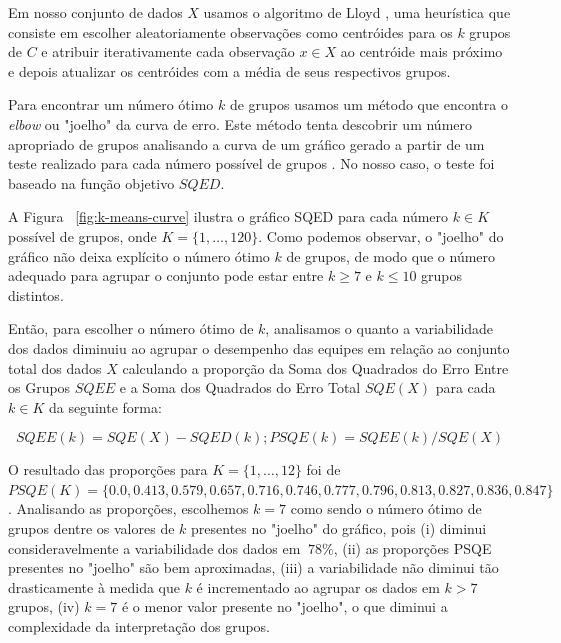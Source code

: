 Em nosso conjunto de dados $X$ usamos o algoritmo de Lloyd \cite{ong2015player}, uma heurística que consiste em escolher aleatoriamente observações como centróides para os $k$ grupos de $C$ e atribuir iterativamente cada observação $x \in X$ ao centróide mais próximo e depois atualizar os centróides com a média de seus respectivos grupos.

Para encontrar um número ótimo $k$ de grupos usamos um método que encontra o \textit{elbow} ou "joelho" da curva de erro. Este método tenta descobrir um número apropriado de grupos analisando a curva de um gráfico gerado a partir de um teste realizado para cada número possível de grupos \cite{kodinariya2013review}. No nosso caso, o teste foi baseado na função objetivo $SQED$.


A Figura ~\ref{fig:k-means-curve} ilustra o gráfico SQED para cada número $k \in K$ possível de grupos, onde $K = \{1, \ldots, 120\}$. Como podemos observar, o "joelho" do gráfico não deixa explícito o número ótimo $k$ de grupos, de modo que o número adequado para agrupar o conjunto pode estar entre $k \geq 7$ e $k \leq 10$ grupos distintos.

Então, para escolher o número ótimo de $k$, analisamos o quanto a variabilidade dos dados diminuiu ao agrupar o desempenho das equipes em relação ao conjunto total dos dados $X$ calculando a proporção da Soma dos Quadrados do Erro Entre os Grupos $SQEE$ e a Soma dos Quadrados do Erro Total $SQE(X)$ para cada $k \in K$ da seguinte forma:

\begin{displaymath}
  SQEE(k) = SQE(X) - SQED(k); PSQE(k) = SQEE(k)/SQE(X)
\end{displaymath}

O resultado das proporções para $K=\{1, \ldots, 12\}$ foi de $PSQE(K) = \{0.0, 0.413, 0.579, 0.657, 0.716, 0.746, 0.777, 0.796, 0.813, 0.827, 0.836, 0.847\}$. Analisando as proporções, escolhemos $k=7$ como sendo o número ótimo de grupos dentre os valores de $k$ presentes no "joelho" do gráfico, pois (i) diminui consideravelmente a variabilidade dos dados em $~78\%$, (ii) as proporções PSQE presentes no "joelho" são bem aproximadas, (iii) a variabilidade não diminui tão drasticamente à medida que $k$ é incrementado ao agrupar os dados em $k > 7$ grupos, (iv) $k=7$ é o menor valor presente no "joelho", o que diminui a complexidade da interpretação dos grupos.

